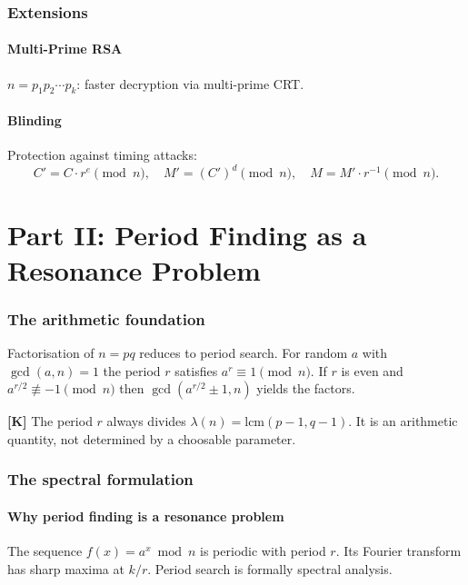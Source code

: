 \section{Extensions}

\subsection{Multi-Prime RSA}

$n = p_1 p_2 \cdots p_k$: faster decryption via multi-prime CRT.

\subsection{Blinding}

Protection against timing attacks:
\[
  C' = C \cdot r^e \pmod n, \quad
  M' = (C')^d \pmod n, \quad
  M = M' \cdot r^{-1} \pmod n.
\]

\part*{Part II: Period Finding as a Resonance Problem}

\section{The arithmetic foundation}

Factorisation of $n=pq$ reduces to period search. For random $a$ with
$\gcd(a,n)=1$ the period $r$ satisfies $a^r \equiv 1 \pmod n$. If $r$
is even and $a^{r/2} \not\equiv -1 \pmod n$ then $\gcd(a^{r/2}\pm1,n)$
yields the factors.

\textbf{[K]} The period $r$ always divides $\lambda(n)=\mathrm{lcm}
(p-1,q-1)$. It is an arithmetic quantity, not determined by a choosable
parameter.

\section{The spectral formulation}

\subsection{Why period finding is a resonance problem}

The sequence $f(x)=a^x \bmod n$ is periodic with period $r$. Its
Fourier transform has sharp maxima at $k/r$. Period search is formally
spectral analysis.

